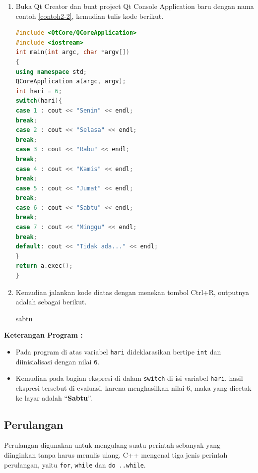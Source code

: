 \begin{enumerate}

\item
  Buka Qt Creator dan buat project Qt Console Application baru dengan
  nama contoh \ref{contoh2-2}, kemudian tulis kode berikut.

\begin{lstlisting}[language=c++, caption=Tipe data dan Identifier, label=contoh2-2]
#include <QtCore/QCoreApplication>
#include <iostream>
int main(int argc, char *argv[])
{
using namespace std;
QCoreApplication a(argc, argv);
int hari = 6;
switch(hari){
case 1 : cout << "Senin" << endl;
break;
case 2 : cout << "Selasa" << endl;
break;
case 3 : cout << "Rabu" << endl;
break;
case 4 : cout << "Kamis" << endl;
break;
case 5 : cout << "Jumat" << endl;
break;
case 6 : cout << "Sabtu" << endl;
break;
case 7 : cout << "Minggu" << endl;
break;
default: cout << "Tidak ada..." << endl;
}
return a.exec();
}
\end{lstlisting}
\item
  Kemudian jalankan kode diatas dengan menekan tombol Ctrl+R, outputnya
  adalah sebagai berikut.

 \begin{lcverbatim}
sabtu
\end{lcverbatim}

\end{enumerate}



\textbf{Keterangan Program :}

\begin{itemize}

\item
  Pada program di atas variabel \texttt{hari} dideklarasikan bertipe
  \texttt{int} dan diinisialisasi dengan nilai \texttt{6}.
\item
  Kemudian pada bagian ekspresi di dalam \texttt{switch} di isi variabel
  \texttt{hari}, hasil ekspresi tersebut di evaluasi, karena
  menghasilkan nilai 6, maka yang dicetak ke layar adalah
  ``\textbf{Sabtu}''.
\end{itemize}

\subsection{Perulangan}\label{b.-perulangan}

Perulangan digunakan untuk mengulang suatu perintah sebanyak yang
diinginkan tanpa harus menulis ulang. C++ mengenal tiga jenis perintah
perulangan, yaitu \texttt{for}, \texttt{while} dan \texttt{do\ ..while}.

